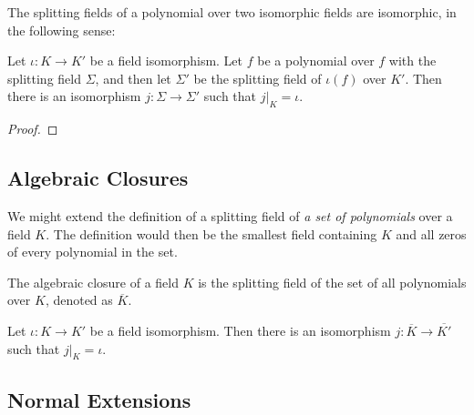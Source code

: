 The splitting fields of a polynomial over two isomorphic fields are isomorphic, in the following sense:

\begin{theorem} \label{thm:splitting-field-unique}
	Let $\iota: K \to K'$ be a field isomorphism. Let $f$ be a polynomial over $f$ with the splitting field $\Sigma$, and then let $\Sigma'$ be the splitting field of $\iota(f)$ over $K'$. Then there is an isomorphism $j : \Sigma \to \Sigma'$ such that $j | _K = \iota$. 
\end{theorem}

\begin{proof}
	\TODO
\end{proof}


\subsection{Algebraic Closures}
We might extend the definition of a splitting field of \textit{a set of polynomials} over a field $K$. The definition would then be the smallest field containing $K$ and all zeros of every polynomial in the set. 
\begin{definition}
    The algebraic closure of a field $K$ is the splitting field of the set of all polynomials over $K$, denoted as $\overline K$. 
\end{definition}


\begin{theorem} 
	Let $\iota: K \to K'$ be a field isomorphism. Then there is an isomorphism $j: \overline K \to \overline {K'}$ such that $j |_K = \iota$. 
\end{theorem}

%



\subsection{Normal Extensions}


